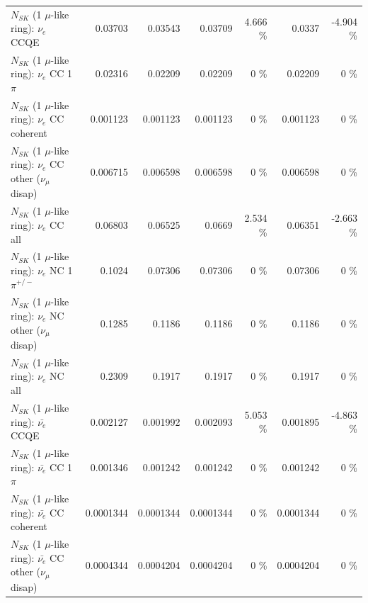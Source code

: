 \begin{table}
\begin{tabular}{| l | r | r | r  r | r  r |}
\hline
\hline
\hline
                                      $N_{SK}$ (1 $\mu$-like ring): $\nu_e$ CCQE &         0.03703 &         0.03543 &         0.03709 &    4.666 \%  &          0.0337 &   -4.904 \%  \\ 
                                 $N_{SK}$ (1 $\mu$-like ring): $\nu_e$ CC 1$\pi$ &         0.02316 &         0.02209 &         0.02209 &        0 \%  &         0.02209 &        0 \%  \\ 
                               $N_{SK}$ (1 $\mu$-like ring): $\nu_e$ CC coherent &        0.001123 &        0.001123 &        0.001123 &        0 \%  &        0.001123 &        0 \%  \\ 
                $N_{SK}$ (1 $\mu$-like ring): $\nu_e$ CC other ($\nu_\mu$ disap) &        0.006715 &        0.006598 &        0.006598 &        0 \%  &        0.006598 &        0 \%  \\ 
                                  $N_{SK}$ (1 $\mu$-like ring): $\nu_{e}$ CC all &         0.06803 &         0.06525 &          0.0669 &    2.534 \%  &         0.06351 &   -2.663 \%  \\ 
\hline
                           $N_{SK}$ (1 $\mu$-like ring): $\nu_e$ NC 1$\pi^{+/-}$ &          0.1024 &         0.07306 &         0.07306 &        0 \%  &         0.07306 &        0 \%  \\ 
                $N_{SK}$ (1 $\mu$-like ring): $\nu_e$ NC other ($\nu_\mu$ disap) &          0.1285 &          0.1186 &          0.1186 &        0 \%  &          0.1186 &        0 \%  \\ 
                                  $N_{SK}$ (1 $\mu$-like ring): $\nu_{e}$ NC all &          0.2309 &          0.1917 &          0.1917 &        0 \%  &          0.1917 &        0 \%  \\ 
\hline
\hline
\hline
                                $N_{SK}$ (1 $\mu$-like ring): $\bar{\nu_e}$ CCQE &        0.002127 &        0.001992 &        0.002093 &    5.053 \%  &        0.001895 &   -4.863 \%  \\ 
                           $N_{SK}$ (1 $\mu$-like ring): $\bar{\nu_e}$ CC 1$\pi$ &        0.001346 &        0.001242 &        0.001242 &        0 \%  &        0.001242 &        0 \%  \\ 
                         $N_{SK}$ (1 $\mu$-like ring): $\bar{\nu_e}$ CC coherent &       0.0001344 &       0.0001344 &       0.0001344 &        0 \%  &       0.0001344 &        0 \%  \\ 
          $N_{SK}$ (1 $\mu$-like ring): $\bar{\nu_e}$ CC other ($\nu_\mu$ disap) &       0.0004344 &       0.0004204 &       0.0004204 &        0 \%  &       0.0004204 &        0 \%  \\ 

\end{tabular}
\end{table}
